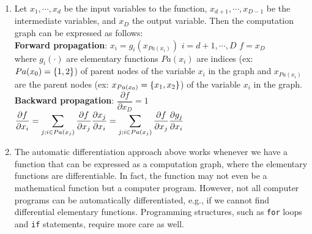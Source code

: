 \begin{enumerate}
    \item Let $x_1, \cdots , x_d$ be the input variables to the function, $x_{d+1}, \cdots , x_{D-1}$ be the intermediate variables, and $x_D$ the output variable. Then the computation graph can be expressed as follows:
    \hfill \cite{mfml/book/mml/Deisenroth-Faisal-Ong}
    \\
    \textbf{Forward propagation}:\hfill
    $x_i = g_i(x_{Pa(x_i)})$ 
    \hspace{1cm} 
    $i = d+1, \cdots, D$
    \hspace{1cm} 
    $f = x_D$
    \hfill \cite{mfml/book/mml/Deisenroth-Faisal-Ong}
    \\
    where 
    $g_i(\cdot)$ are elementary functions 
    $Pa(x_i)$ are indices (ex: $Pa(x_0) = \left\{1, 2\right\}$) of parent nodes of the variable $x_i$ in the graph
    and 
    $x_{Pa(x_i)}$ are the parent nodes (ex: $x_{Pa(x_0)} = \left\{x_1, x_2\right\}$) of the variable $x_i$ in the graph.
    \hfill \cite{mfml/book/mml/Deisenroth-Faisal-Ong}
    \\
    \textbf{Backward propagation}:\hfill
    $\dfrac{\partial f}{\partial x_D} = 1$
    \hspace{1cm}
    $
        \dfrac{\partial f}{\partial x_i}
        = \displaystyle\sum_{j; i \in Pa(x_j)} \dfrac{\partial f}{\partial x_j} \dfrac{\partial x_j}{\partial x_i}
        = \displaystyle\sum_{j; i \in Pa(x_j)} \dfrac{\partial f}{\partial x_j} \dfrac{\partial g_j}{\partial x_i}
    $
    \hfill \cite{mfml/book/mml/Deisenroth-Faisal-Ong}


    \item The automatic differentiation approach above works whenever we have a function that can be expressed as a computation graph, where the elementary functions are differentiable. 
    In fact, the function may not even be a mathematical function but a computer program. 
    However, not all computer programs can be automatically differentiated, e.g., if we cannot find differential elementary functions. 
    Programming structures, such as \verb|for| loops and \verb|if| statements, require more care as well.
    \hfill \cite{mfml/book/mml/Deisenroth-Faisal-Ong}








\end{enumerate}
